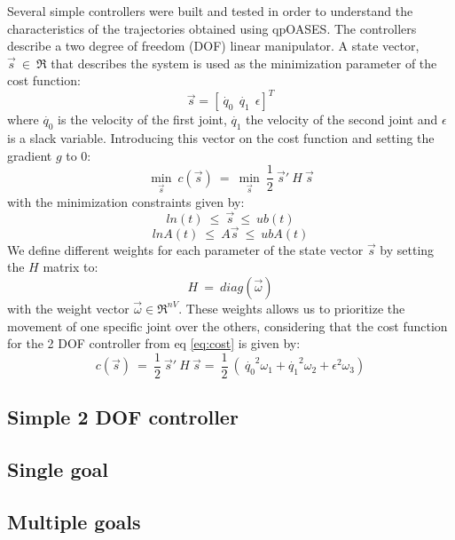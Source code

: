 Several simple controllers were built and tested in order to understand the characteristics of the trajectories obtained using qpOASES. The controllers describe a two degree of freedom (DOF) linear manipulator. A state vector, $\vec{s}\ \in\ \Re$ that describes the system is used as the minimization parameter of the cost function:
\begin{equation}
 \vec{s} = [\dot{\ q_{0}} \ \ \dot{q_{1}} \ \ \epsilon ]^{T}
\end{equation}
where $\dot{q_{0}}$ is the velocity of the first joint, $\dot{q_{1}}$ the velocity of the second joint and $\epsilon$ is a slack variable. Introducing this vector on the cost function and setting the gradient $g$ to 0:
\begin{equation}
\underset{\vec{s}}{\min}\ c(\vec{s})\ =\  \underset{\vec{s}}{\min}\ \frac{1}{2} \ \vec{s}' \ H \ \vec{s}
\label{eq:cost}
\end{equation}
with the minimization constraints given by:
\begin{equation}
ln(t)\ \leq\ \vec{s}\ \leq\ ub(t)
\end{equation}
\begin{equation}
lnA(t)\ \leq\ A \vec{s}\ \leq\ ubA(t)
\end{equation}
We define different weights for each parameter of the state vector $\vec{s}$ by setting the $H$ matrix to:
\begin{equation*}
H\ =\ diag(\vec{\omega})
\end{equation*}
with the weight vector $\vec{\omega} \in \Re^{nV}$. These weights allows us to prioritize the movement of one specific joint over the others, considering that the cost function for the 2 DOF controller from eq \ref{eq:cost} is given by:
\begin{equation}
c(\vec{s})\ =\ \frac{1}{2} \ \vec{s}' \ H \ \vec{s} =\ \frac{1}{2} \ (\ \dot{q_{0}}^{2}\omega_{1} + \dot{q_{1}}^{2}\omega_{2} + \epsilon^{2}\omega_{3})
\end{equation}


\subsection{Simple 2 DOF controller}

\subsection{Single goal}
\subsection{Multiple goals}
